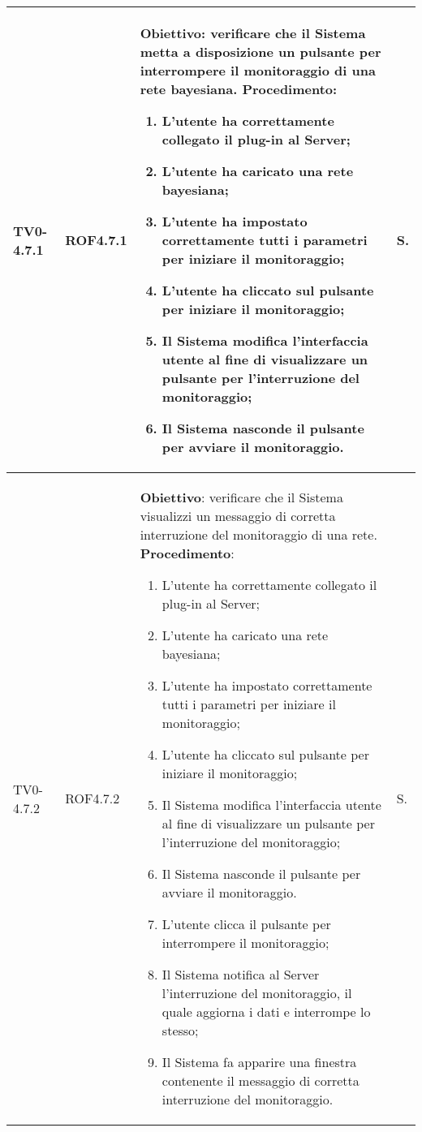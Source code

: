 \begin{longtable}{|C{.15\textwidth}|C{.13\textwidth}|m{.65\textwidth}|C{.08\textwidth}|}
TV0-4.7.1 & ROF4.7.1 &
	\textbf{Obiettivo}: verificare che il Sistema metta a disposizione un pulsante per interrompere il monitoraggio di una rete bayesiana. \newline
	\textbf{Procedimento}:
	\begin{enumerate}
		\item L'utente ha correttamente collegato il plug-in al Server;
		\item L'utente ha caricato una rete bayesiana;
		\item L'utente ha impostato correttamente tutti i parametri per iniziare il monitoraggio;
		\item L'utente ha cliccato sul pulsante per iniziare il monitoraggio;
		\item Il Sistema modifica l'interfaccia utente al fine di visualizzare un pulsante per l'interruzione del monitoraggio;
		\item Il Sistema nasconde il pulsante per avviare il monitoraggio.
	\end{enumerate}
	& S. \\
\hline

TV0-4.7.2 & ROF4.7.2 &
	\textbf{Obiettivo}: verificare che il Sistema visualizzi un messaggio di corretta interruzione del monitoraggio di una rete. \newline
	\textbf{Procedimento}:
	\begin{enumerate}
		\item L'utente ha correttamente collegato il plug-in al Server;
		\item L'utente ha caricato una rete bayesiana;
		\item L'utente ha impostato correttamente tutti i parametri per iniziare il monitoraggio;
		\item L'utente ha cliccato sul pulsante per iniziare il monitoraggio;
		\item Il Sistema modifica l'interfaccia utente al fine di visualizzare un pulsante per l'interruzione del monitoraggio;
		\item Il Sistema nasconde il pulsante per avviare il monitoraggio.
		\item L'utente clicca il pulsante per interrompere il monitoraggio;
		\item Il Sistema notifica al Server l'interruzione del monitoraggio, il quale aggiorna i dati e interrompe lo stesso;
		\item Il Sistema fa apparire una finestra contenente il messaggio di corretta interruzione del monitoraggio.
	\end{enumerate}
	& S. \\
\hline


\end{longtable}
